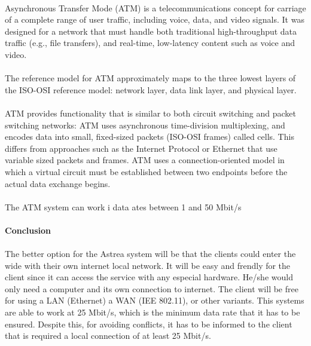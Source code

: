 \paragraph{} 
Asynchronous Transfer Mode (ATM) is a telecommunications concept for carriage of a complete range of user traffic, including voice, data, and video signals. It was designed for a network that must handle both traditional high-throughput data traffic (e.g., file transfers), and real-time, low-latency content such as voice and video. 
\paragraph{}
The reference model for ATM approximately maps to the three lowest layers of the ISO-OSI reference model: network layer, data link layer, and physical layer.
\paragraph{}
ATM provides functionality that is similar to both circuit switching and packet switching networks: ATM uses asynchronous time-division multiplexing, and encodes data into small, fixed-sized packets (ISO-OSI frames) called cells. This differs from approaches such as the Internet Protocol or Ethernet that use variable sized packets and frames. ATM uses a connection-oriented model in which a virtual circuit must be established between two endpoints before the actual data exchange begins.
\paragraph{}
The ATM system can work i data ates between 1 and 50 Mbit/s

\paragraph{} \textbf{Conclusion}
\paragraph{}
The better option for the Astrea system will be that the clients could enter the wide with their own internet local network. It will be easy and frendly for the client since it can access the service with any especial hardware. He/she would only need a computer and its own connection to internet. The client will be free for using a LAN (Ethernet) a WAN (IEE 802.11), or other variants. This systems are able to work at 25 Mbit/s, which is the minimum data rate that it has to be ensured. Despite this, for avoiding conflicts, it has to be informed to the client that is required a local connection of at least 25 Mbit/s.


